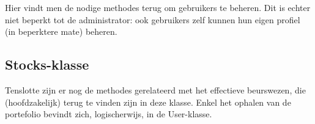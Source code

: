 Hier vindt men de nodige methodes terug om gebruikers te beheren. Dit is echter niet beperkt tot de administrator: ook gebruikers zelf kunnen hun eigen profiel (in beperktere mate) beheren.

\subsection{Stocks-klasse}

Tenslotte zijn er nog de methodes gerelateerd met het effectieve beurswezen, die (hoofdzakelijk) terug te vinden zijn in deze klasse. Enkel het ophalen van de portefolio bevindt zich, logischerwijs, in de User-klasse.
